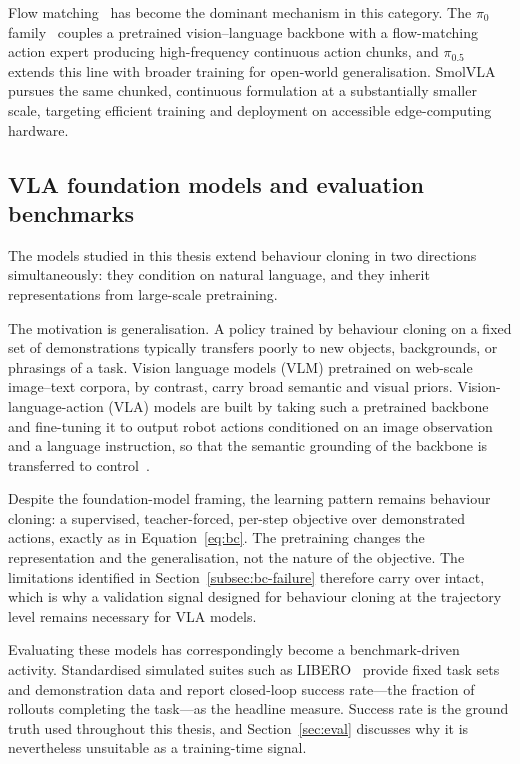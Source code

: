 \documentclass[english,12pt,a4paper,pdftex,elec,utf8]{aaltothesis}
\begin{document}
Flow matching~\cite{lipman2023flow} has become the dominant mechanism in this category. The $\pi_0$ family~\cite{black2024pi0} couples a pretrained vision--language backbone with a flow-matching action expert producing high-frequency continuous action chunks, and $\pi_{0.5}$ \citep{intelligence2025pi05} extends this line with broader training for open-world generalisation. SmolVLA~\cite{shukor2025smolvla} pursues the same chunked, continuous formulation at a substantially smaller scale, targeting efficient training and deployment on accessible edge-computing hardware.

\subsection{VLA foundation models and evaluation benchmarks}
\label{sec:vla-foundation}

The models studied in this thesis extend behaviour cloning in two directions simultaneously: they condition on natural language, and they inherit representations from large-scale pretraining.

The motivation is generalisation. A policy trained by behaviour cloning on a fixed set of demonstrations typically transfers poorly to new objects, backgrounds, or phrasings of a task. Vision language models (VLM) pretrained on web-scale image--text corpora, by contrast, carry broad semantic and visual priors. Vision-language-action (VLA) models are built by taking such a pretrained backbone and fine-tuning it to output robot actions conditioned on an image observation and a language instruction, so that the semantic grounding of the backbone is transferred to control~\cite{brohan2023rt2}.

Despite the foundation-model framing, the learning pattern remains behaviour cloning: a supervised, teacher-forced, per-step objective over demonstrated actions, exactly as in Equation~\eqref{eq:bc}. The pretraining changes the representation and the generalisation, not the nature of the objective. The limitations identified in Section~\ref{subsec:bc-failure} therefore carry over intact, which is why a validation signal designed for behaviour cloning at the trajectory level remains necessary for VLA models.

Evaluating these models has correspondingly become a benchmark-driven activity. Standardised simulated suites such as LIBERO~\cite{liu2023libero} provide fixed task sets and demonstration data and report closed-loop success rate---the fraction of rollouts completing the task---as the headline measure. Success rate is the ground truth used throughout this thesis, and Section~\ref{sec:eval} discusses why it is nevertheless unsuitable as a training-time signal.
\end{document}
